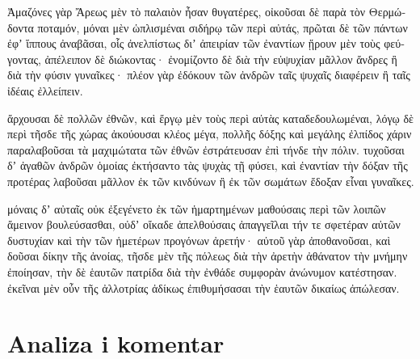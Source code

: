 {\large

\begin{greek}

\noindent Ἀμαζόνες γὰρ Ἄρεως μὲν τὸ παλαιὸν ἦσαν θυγατέρες, οἰκοῦσαι δὲ παρὰ τὸν Θερμώδοντα ποταμόν, μόναι μὲν ὡπλισμέναι σιδήρῳ τῶν περὶ αὐτάς, πρῶται δὲ τῶν πάντων ἐφʼ ἵππους ἀναβᾶσαι, οἷς ἀνελπίστως διʼ ἀπειρίαν τῶν ἐναντίων ᾕρουν μὲν τοὺς φεύγοντας, ἀπέλειπον δὲ διώκοντας· ἐνομίζοντο δὲ διὰ τὴν εὐψυχίαν μᾶλλον ἄνδρες ἢ διὰ τὴν φύσιν γυναῖκες· πλέον γὰρ ἐδόκουν τῶν ἀνδρῶν ταῖς ψυχαῖς διαφέρειν ἢ ταῖς ἰδέαις ἐλλείπειν.

ἄρχουσαι δὲ πολλῶν ἐθνῶν, καὶ ἔργῳ μὲν τοὺς περὶ αὐτὰς καταδεδουλωμέναι, λόγῳ δὲ περὶ τῆσδε τῆς χώρας ἀκούουσαι κλέος μέγα, πολλῆς δόξης καὶ μεγάλης ἐλπίδος χάριν παραλαβοῦσαι τὰ μαχιμώτατα τῶν ἐθνῶν ἐστράτευσαν ἐπὶ τήνδε τὴν πόλιν. τυχοῦσαι δʼ ἀγαθῶν ἀνδρῶν ὁμοίας ἐκτήσαντο τὰς ψυχὰς τῇ φύσει, καὶ ἐναντίαν τὴν δόξαν τῆς προτέρας λαβοῦσαι μᾶλλον ἐκ τῶν κινδύνων ἢ ἐκ τῶν σωμάτων ἔδοξαν εἶναι γυναῖκες.

μόναις δʼ αὐταῖς οὐκ ἐξεγένετο ἐκ τῶν ἡμαρτημένων μαθούσαις περὶ τῶν λοιπῶν ἄμεινον βουλεύσασθαι, οὐδʼ οἴκαδε ἀπελθούσαις ἀπαγγεῖλαι τήν τε σφετέραν αὐτῶν δυστυχίαν καὶ τὴν τῶν ἡμετέρων προγόνων ἀρετήν· αὐτοῦ γὰρ ἀποθανοῦσαι, καὶ δοῦσαι δίκην τῆς ἀνοίας, τῆσδε μὲν τῆς πόλεως διὰ τὴν ἀρετὴν ἀθάνατον τὴν μνήμην ἐποίησαν, τὴν δὲ ἑαυτῶν πατρίδα διὰ τὴν ἐνθάδε συμφορὰν ἀνώνυμον κατέστησαν. ἐκεῖναι μὲν οὖν τῆς ἀλλοτρίας ἀδίκως ἐπιθυμήσασαι τὴν ἑαυτῶν δικαίως ἀπώλεσαν.

\end{greek}

}

\newpage

\section*{Analiza i komentar}


